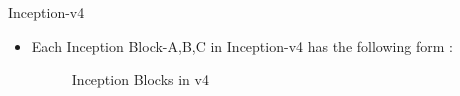 \documentclass{beamer}
\begin{document}
\begin{frame}{Inception-v4}
	\begin{itemize}
		\item Each Inception Block-A,B,C in Inception-v4 has the following form :
		\vspace{10pt}
		\begin{figure}[h]		
			\centering
			\quad
			\quad
			\caption{Inception Blocks in v4}
			\label{Inception Blocks v4}
		\end{figure}
	\end{itemize}
\end{frame}
\end{document}
